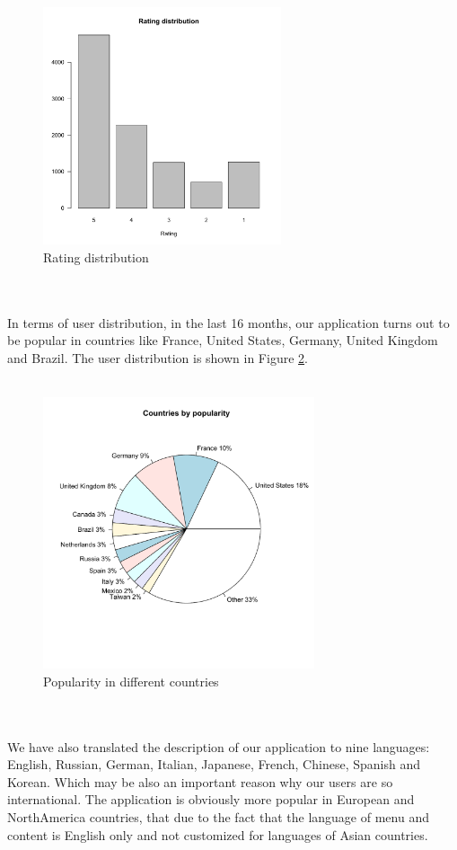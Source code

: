\\
\begin{figure}[htb]
\centering \includegraphics[height=7cm]{charts/rating_distribution}
\caption{Rating distribution\label{ratings}}
\end{figure}\\
\\
In terms of user distribution, in the last 16 months, our application turns out
to be popular in countries like France, United States, Germany, United Kingdom
and Brazil. The user distribution is shown in Figure \ref{user_country}.\\
\\
\begin{figure}[htb]
\centering \includegraphics[height=8cm]{charts/country_popularity}
\caption{Popularity in different countries \label{user_country}}
\end{figure}\\
\\
We have also translated the description of our application to nine languages:
 English, Russian, German, Italian, Japanese, French, Chinese, Spanish and Korean. Which may be also an important reason why our users are so international. The application is obviously more popular in European and NorthAmerica countries, that due to the fact that the language of  menu and content is English only and not customized for languages of Asian countries.\\
